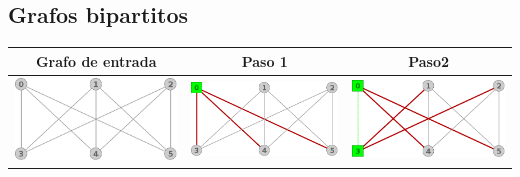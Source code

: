 \subsection{Grafos bipartitos}
	\begin{center}
		\begin{tabular}{ |c||c||c| }
			\hline
			Grafo de entrada & Paso 1 & Paso2 \\
			\hline\hline
			\includegraphics[scale = 0.2]{img/ej3/constructiva_golosa/k3,3_st0.png} &
			\includegraphics[scale = 0.2]{img/ej3/constructiva_golosa/k3,3_st1.png} &
			\includegraphics[scale = 0.2]{img/ej3/constructiva_golosa/k3,3_st2.png} \\

\end{tabular}
\end{center}
